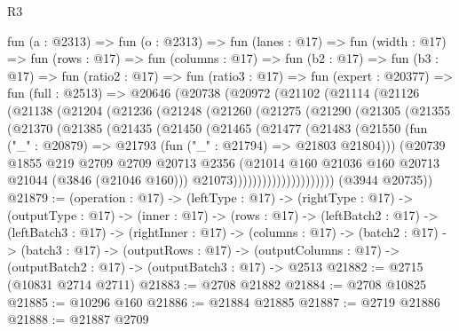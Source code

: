\begin{lexlean}{R3}
\begin{coremodule}
  fun (a : @2313) =>
  fun (o : @2313) =>
  fun (lanes : @17) =>
  fun (width : @17) =>
  fun (rows : @17) =>
  fun (columns : @17) =>
  fun (b2 : @17) =>
  fun (b3 : @17) =>
  fun (ratio2 : @17) =>
  fun (ratio3 : @17) =>
  fun (expert : @20377) =>
  fun (full : @2513) =>
  @20646
    (@20738
      (@20972
        (@21102
          (@21114
            (@21126
              (@21138
                (@21204
                  (@21236
                    (@21248
                      (@21260
                        (@21275
                          (@21290
                            (@21305
                              (@21355
                                (@21370
                                  (@21385
                                    (@21435
                                      (@21450
                                        (@21465
                                          (@21477
                                            (@21483
                                              (@21550
                                                (fun ("_" : @20879) =>
                                                @21793 (fun ("_" : @21794) => @21803 @21804)))
                                              (@20739
                                                @1855
                                                @219
                                                @2709
                                                @2709
                                                @20713
                                                @2356
                                                (@21014
                                                  @160
                                                  @21036
                                                  @160
                                                  @20713
                                                  @21044
                                                  (@3846 (@21046 @160)))
                                                @21073)))))))))))))))))))))
      (@3944 @20735))
@21879 := (operation : @17) ->
  (leftType : @17) ->
  (rightType : @17) ->
  (outputType : @17) ->
  (inner : @17) ->
  (rows : @17) ->
  (leftBatch2 : @17) ->
  (leftBatch3 : @17) ->
  (rightInner : @17) ->
  (columns : @17) ->
  (batch2 : @17) ->
  (batch3 : @17) ->
  (outputRows : @17) ->
  (outputColumns : @17) -> (outputBatch2 : @17) -> (outputBatch3 : @17) -> @2513
@21882 := @2715 (@10831 @2714 @2711)
@21883 := @2708 @21882
@21884 := @2708 @10825
@21885 := @10296 @160
@21886 := @21884 @21885
@21887 := @2719 @21886
@21888 := @21887 @2709

\end{coremodule}
\end{lexlean}
